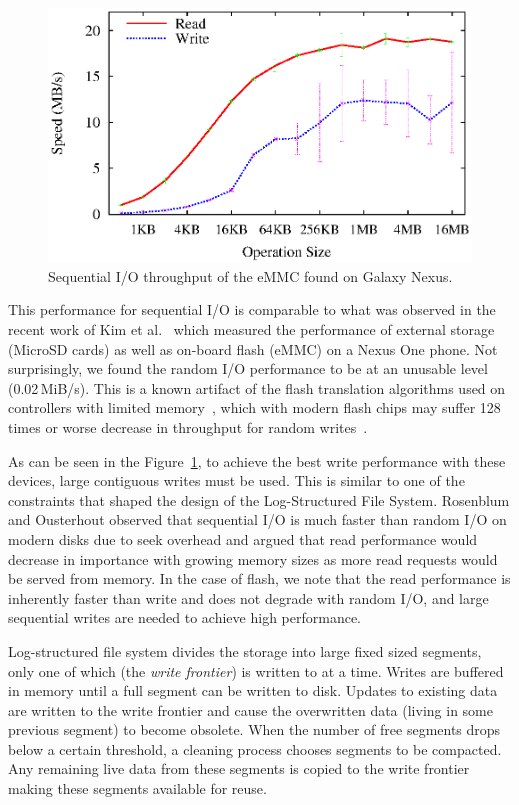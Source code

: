\documentclass{sig-alternate}
\begin{document}
\begin{figure}[t]
  \begin{center}
    \includegraphics[width=1.04\columnwidth]{graphs/galaxy-nexus-seq}
  \end{center}
  \caption{Sequential I/O throughput of the eMMC found on Galaxy Nexus.}
  \label{fig:galaxy-nexus-seq} 
\end{figure}

This performance for sequential I/O is comparable to what was observed in the
recent work of Kim et al.~\cite{kim12} which measured the performance of
external storage (MicroSD cards) as well as on-board flash (eMMC) on a Nexus One
phone.  Not surprisingly, we found the random I/O performance to be at an
unusable level (0.02\,MiB/s).  This is a known artifact of the flash translation
algorithms used on controllers with limited memory~\cite{Kim2002:FTL}, which
with modern flash chips may suffer 128 times or worse decrease in throughput for
random writes~\cite{boboila_performance_2011}.

As can be seen in the Figure~\ref{fig:galaxy-nexus-seq}, to achieve the best
write performance with these devices, large contiguous writes must be used.
This is similar to one of the constraints that shaped the design of the
Log-Structured File System.  Rosenblum and Ousterhout observed that sequential
I/O is much faster than random I/O on modern disks due to seek overhead and
argued that read performance would decrease in importance with growing memory
sizes as more read requests would be served from memory.  In the case of flash,
we note that the read performance is inherently faster than write and does not
degrade with random I/O, and large sequential writes are needed to achieve high
performance.

Log-structured file system divides the storage into large fixed sized segments,
only one of which (the \emph{write frontier}) is written to at a time.  Writes
are buffered in memory until a full segment can be written to disk.  Updates to
existing data are written to the write frontier and cause the overwritten data
(living in some previous segment) to become obsolete.  When the number of free
segments drops below a certain threshold, a cleaning process chooses segments to
be compacted.  Any remaining live data from these segments is copied to the
write frontier making these segments available for reuse.
\end{document}
